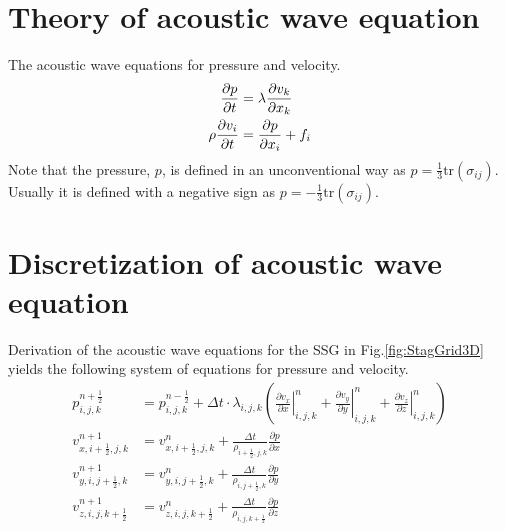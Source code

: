 \documentclass[pdftex,a4paper,parskip,listof=totoc,bibliography=totoc,onehalfspacing,12pt]{scrreprt}
\begin{document}
\section{Theory of acoustic wave equation}
The acoustic wave equations for pressure and velocity.
\begin{align}
\pdv{p}{t} &= \lambda \pdv{v_k}{x_k} \\
\rho\pdv{v_i}{t}&=\pdv{p}{x_i}+ f_i
\end{align}
Note that the pressure, $p$, is defined in an unconventional way as $p=\frac{1}{3}\mathrm{tr}(\sigma_{ij})$. Usually it is defined with a negative sign as $p=-\frac{1}{3}\mathrm{tr}(\sigma_{ij})$.

\section{Discretization of acoustic wave equation}
Derivation of the acoustic wave equations for the SSG in Fig.\ref{fig:StagGrid3D} yields the following system of equations for pressure and velocity. \\
\begin{align*}
	p_{i,j,k}^{n+\frac{1}{2}} &= p_{i,j,k}^{n-\frac{1}{2}} + \Delta t \cdot \lambda_{i,j,k} \left( \left.\frac{\partial v_x}{\partial x}\right\rvert_{i,j,k}^n + \left.\frac{\partial v_y}{\partial y}\right\rvert_{i,j,k}^n + \left.\frac{\partial v_z}{\partial z}\right\rvert_{i,j,k}^n \right)\\
	v_{x,i+\frac{1}{2},j,k}^{n+1} &= v_{x,i+\frac{1}{2},j,k}^n + \frac{\Delta t}{\rho_{i+\frac{1}{2},j,k}} \frac{\partial p}{\partial x} \\
	v_{y,i,j+\frac{1}{2},k}^{n+1} &= v_{y,i,j+\frac{1}{2},k}^n + \frac{\Delta t}{\rho_{i,j+\frac{1}{2},k}} \frac{\partial p}{\partial y} \\
	v_{z,i,j,k+\frac{1}{2}}^{n+1} &= v_{z,i,j,k+\frac{1}{2}}^n + \frac{\Delta t}{\rho_{i,j,k+\frac{1}{2}}} \frac{\partial p}{\partial z}
\end{align*}
\end{document}
